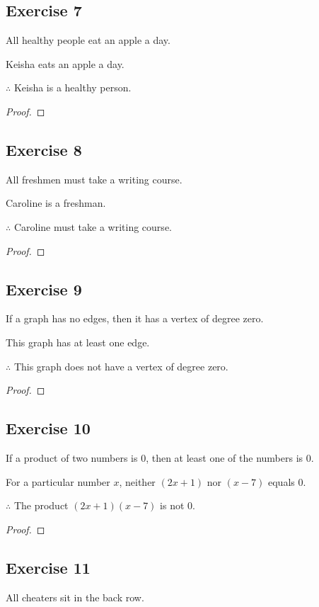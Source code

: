 \documentclass[14pt]{extarticle}
\begin{document}
\subsection{Exercise 7}
All healthy people eat an apple a day.

Keisha eats an apple a day.

$\therefore$ Keisha is a healthy person.

\begin{proof}

\end{proof}

\subsection{Exercise 8}
All freshmen must take a writing course.

Caroline is a freshman.

$\therefore$ Caroline must take a writing course.

\begin{proof}

\end{proof}

\subsection{Exercise 9}
If a graph has no edges, then it has a vertex of degree zero.

This graph has at least one edge.

$\therefore$ This graph does not have a vertex of degree zero.

\begin{proof}

\end{proof}

\subsection{Exercise 10}
If a product of two numbers is 0, then at least one of the numbers is 0.

For a particular number $x$, neither $(2x + 1)$ nor $(x - 7)$ equals 0.

$\therefore$ The product $(2x + 1)(x - 7)$ is not 0.

\begin{proof}

\end{proof}

\subsection{Exercise 11}
All cheaters sit in the back row. 
\end{document}

